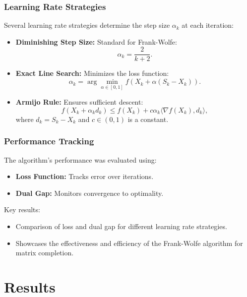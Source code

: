 \documentclass[12pt]{beamer}
\begin{document}
\begin{frame}
    \frametitle{Learning Rate Strategies}

    Several learning rate strategies determine the step size \( \alpha_k \) at each iteration:

    \begin{itemize}
        \item \textbf{Diminishing Step Size:} Standard for Frank-Wolfe:
        \[
        \alpha_k = \frac{2}{k+2}.
        \]

        \item \textbf{Exact Line Search:} Minimizes the loss function:
        \[
        \alpha_k = \arg \min_{\alpha \in [0, 1]} f(X_k + \alpha (S_k - X_k)).
        \]

        \item \textbf{Armijo Rule:} Ensures sufficient descent:
        \[
        f(X_k + \alpha_k d_k) \leq f(X_k) + c \alpha_k \langle \nabla f(X_k), d_k \rangle,
        \]
        where \( d_k = S_k - X_k \) and \( c \in (0, 1) \) is a constant.
    \end{itemize}
\end{frame}

\begin{frame}
    \frametitle{Performance Tracking}

    The algorithm's performance was evaluated using:

    \begin{itemize}
        \item \textbf{Loss Function:} Tracks error over iterations.
        \item \textbf{Dual Gap:} Monitors convergence to optimality.
    \end{itemize}

    \vspace{0.3cm}

    Key results:
    \begin{itemize}
        \item Comparison of loss and dual gap for different learning rate strategies.
        \item Showcases the effectiveness and efficiency of the Frank-Wolfe algorithm for matrix completion.
    \end{itemize}
\end{frame}



\section{Results}
\end{document}
